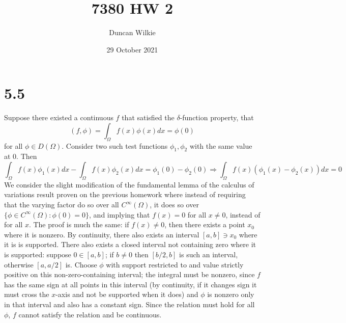 \documentclass{article}
\title{7380 HW 2}
\author{Duncan Wilkie}
\date{29 October 2021}
\begin{document}
\maketitle

\section*{5.5}
Suppose there existed a continuous $f$ that satisfied the $\delta$-function property, that
\[(f,\phi)=\int_\Omega f(x)\phi(x)dx=\phi(0)\] for all $\phi\in D(\Omega)$. Consider two such test functions $\phi_1,\phi_2$ with the same value at 0. Then
\[\int_\Omega f(x)\phi_1(x)dx-\int_\Omega f(x)\phi_2(x)dx = \phi_1(0)-\phi_2(0)\Rightarrow \int_\Omega f(x)(\phi_1(x)-\phi_2(x))dx = 0\]
We consider the slight modification of the fundamental lemma of the calculus of variations result proven on the previous homework where instead of requiring that the varying factor do so over all $C^\infty(\Omega)$, it does so over $\{\phi\in C^\infty(\Omega): \phi(0)=0\}$, and implying that $f(x)=0$ for all $x\neq 0 $, instead of for all $x$. The proof is much the same: if $f(x)\neq 0$, then there exists a point $x_0$ where it is nonzero. By continuity, there also exists an interval $[a,b]\ni x_0 $ where it is is supported. There also exists a closed interval not containing zero where it is supported: suppose $0\in[a,b]$; if $b\neq 0$ then $[b/2, b]$ is such an interval, otherwise $[a, a/2]$ is. Choose $\phi$ with support restricted to and value strictly positive on this non-zero-containing interval; the integral must be nonzero, since $f$ has the same sign at all points in this interval (by continuity, if it changes sign it must cross the $x$-axis and not be supported when it does) and $\phi$ is nonzero only in that interval and also has a constant sign. Since the relation must hold for all $\phi$, $f$ cannot satisfy the relation and be continuous.
\end{document}
